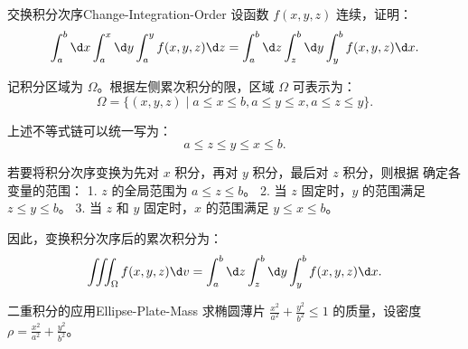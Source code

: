 \begin{problem}{交换积分次序}{Change-Integration-Order}
    设函数 $f(x, y, z)$ 连续，证明：
    \begin{equation}
        \int_a^b \d x \int_a^x \d y \int_a^y f(x, y, z) \d z = \int_a^b \d z \int_z^b \d y \int_y^b f(x, y, z) \d x.
    \end{equation}
\end{problem}

\begin{myproof}
    记积分区域为 $\Omega$。根据左侧累次积分的限，区域 $\Omega$ 可表示为：
    \begin{equation}
        \Omega = \{ (x, y, z) \mid a \le x \le b, a \le y \le x, a \le z \le y \}.
    \end{equation}

    上述不等式链可以统一写为：
    \begin{equation}
        a \le z \le y \le x \le b.
        \label{eq:chain-ineq}
    \end{equation}

    若要将积分次序变换为先对 $x$ 积分，再对 $y$ 积分，最后对 $z$ 积分，则根据  确定各变量的范围：
    1. $z$ 的全局范围为 $a \le z \le b$。
    2. 当 $z$ 固定时，$y$ 的范围满足 $z \le y \le b$。
    3. 当 $z$ 和 $y$ 固定时，$x$ 的范围满足 $y \le x \le b$。

    因此，变换积分次序后的累次积分为：
    \begin{equation}
        \iiint_{\Omega} f(x, y, z) \d v = \int_a^b \d z \int_z^b \d y \int_y^b f(x, y, z) \d x.
    \end{equation}
\end{myproof}

\begin{problem}{二重积分的应用}{Ellipse-Plate-Mass}
    求椭圆薄片 $\frac{x^2}{a^2} + \frac{y^2}{b^2} \leqslant 1$ 的质量，设密度 $\rho = \frac{x^2}{a^2} + \frac{y^2}{b^2}$。
\end{problem}

